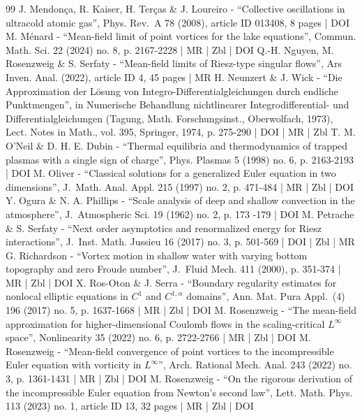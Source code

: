 \begin{thebibliography}{99}
J. Mendonça, R. Kaiser, H. Terças \& J. Loureiro - “Collective oscillations in ultracold atomic gas”, Phys. Rev. A 78 (2008), article ID 013408, 8 pages | DOI
M. Ménard - “Mean-field limit of point vortices for the lake equations”, Commun. Math. Sci. 22 (2024) no. 8, p. 2167-2228 | MR | Zbl | DOI
Q.-H. Nguyen, M. Rosenzweig \& S. Serfaty - “Mean-field limits of Riesz-type singular flows”, Ars Inven. Anal. (2022), article ID 4, 45 pages | MR
H. Neunzert \& J. Wick - “Die Approximation der Lösung von Integro-Differentialgleichungen durch endliche Punktmengen”, in Numerische Behandlung nichtlinearer Integrodifferential- und Differentialgleichungen (Tagung, Math. Forschungsinst., Oberwolfach, 1973), Lect. Notes in Math., vol. 395, Springer, 1974, p. 275-290 | DOI | MR | Zbl
T. M. O’Neil \& D. H. E. Dubin - “Thermal equilibria and thermodynamics of trapped plasmas with a single sign of charge”, Phys. Plasmas 5 (1998) no. 6, p. 2163-2193 | DOI
M. Oliver - “Classical solutions for a generalized Euler equation in two dimensions”, J. Math. Anal. Appl. 215 (1997) no. 2, p. 471-484 | MR | Zbl | DOI
Y. Ogura \& N. A. Phillips - “Scale analysis of deep and shallow convection in the atmosphere”, J. Atmospheric Sci. 19 (1962) no. 2, p. 173 -179 | DOI
M. Petrache \& S. Serfaty - “Next order asymptotics and renormalized energy for Riesz interactions”, J. Inst. Math. Jussieu 16 (2017) no. 3, p. 501-569 | DOI | Zbl | MR
G. Richardson - “Vortex motion in shallow water with varying bottom topography and zero Froude number”, J. Fluid Mech. 411 (2000), p. 351-374 | MR | Zbl | DOI
X. Ros-Oton \& J. Serra - “Boundary regularity estimates for nonlocal elliptic equations in $C^1$ and $C^{1,\alpha }$ domains”, Ann. Mat. Pura Appl. (4) 196 (2017) no. 5, p. 1637-1668 | MR | Zbl | DOI
M. Rosenzweig - “The mean-field approximation for higher-dimensional Coulomb flows in the scaling-critical $L^\infty $ space”, Nonlinearity 35 (2022) no. 6, p. 2722-2766 | MR | Zbl | DOI
M. Rosenzweig - “Mean-field convergence of point vortices to the incompressible Euler equation with vorticity in $L^\infty $”, Arch. Rational Mech. Anal. 243 (2022) no. 3, p. 1361-1431 | MR | Zbl | DOI
M. Rosenzweig - “On the rigorous derivation of the incompressible Euler equation from Newton’s second law”, Lett. Math. Phys. 113 (2023) no. 1, article ID 13, 32 pages | MR | Zbl | DOI

\end{thebibliography}
